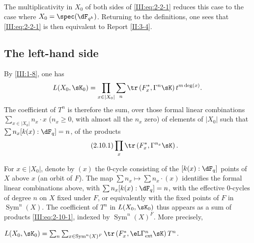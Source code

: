 \documentclass[oneside]{book}
\begin{document}
The multiplicativity in $X_0$ of both sides of \eqref{III:eq:2-2-1} reduces
this case to the case where $X_0=\spec(\dF_{q^k})$. Returning to the
definitions, one sees that \eqref{III:eq:2-2-1} is then equivalent to Report
\ref{II:3-4}.






\subsection{The left-hand side}\label{III:2-10}

By \ref{III:1-8}, one has
\[
  L(X_0,\sK_0) = \prod_{x\in |X_0|} \sum_n \tr\left(F_x^*,\Gamma^n\sK\right) t^{m\deg(x)} \text{.}
\]
The coefficient of $T^n$ is therefore the sum, over those formal linear
combinations $\sum_{x\in |X_0|} n_x\cdot x$ ($n_x\geqslant 0$, with almost
all the $n_x$ zero) of elements of $|X_0|$ such that
$\sum n_x [k(x):\dF_q] = n$, of the products
\begin{equation*}\tag{2.10.1}\label{III:eq:2-10-1}
  \prod_x \tr\left(F_x^*,\Gamma^{n_x} \sK\right) \text{.}
\end{equation*}

For $x\in |X_0|$, denote by $(x)$ the $0$-cycle consisting of the
$[k(x):\dF_q]$ points of $X$ above $x$ (an orbit of $F$). The map
$\sum n_x\mapsto \sum n_x\cdot (x)$ identifies the formal linear combinations
above, with $\sum n_x [k(x):\dF_q]=n$, with the effective $0$-cycles of degree
$n$ on $X$ fixed under $F$, or equivalently with the fixed points of $F$ in
$\operatorname{Sym}^n(X)$. The coefficient of $T^n$ in $L(X_0,\sK_0)$ thus
appears as a sum of products \eqref{III:eq:2-10-1}, indexed by
$\operatorname{Sym}^n(X)^F$. More precisely,





\begin{lemma_}\label{III:2-11}
 $L(X_0,\sK_0) = \sum_n \sum_{x\in\operatorname{Sym}^n(X)^F} \tr\left(F_x^*,\eL\Gamma_\textnormal{ext}^n \sK\right) T^n$.
\end{lemma_}
\end{document}
